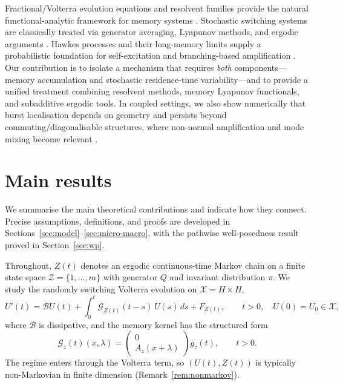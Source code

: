 \documentclass[12pt,a4paper]{article}
\theoremstyle{plain}
\theoremstyle{definition}
\theoremstyle{remark}
\begin{document}
	Fractional/Volterra evolution equations and resolvent families provide the natural functional-analytic framework for memory systems
	\cite{pruss1993evolution,bazhlekova2000fractional}.
	Stochastic switching systems are classically treated via generator averaging, Lyapunov methods, and ergodic arguments
	\cite{mao1999,yin2010}.
	Hawkes processes and their long-memory limits supply a probabilistic foundation for self-excitation and branching-based amplification
	\cite{hawkes1971spectra,bremaud1996,jaisson2015limit,jaisson2016rough,chevallier2019}.
	Our contribution is to isolate a mechanism that requires \emph{both} components---memory accumulation and stochastic residence-time
	variability---and to provide a unified treatment combining resolvent methods, memory Lyapunov functionals, and subadditive ergodic
	tools.
	In coupled settings, we also show numerically that burst localisation depends on geometry and persists beyond commuting/diagonalisable
	structures, where non-normal amplification and mode mixing become relevant \cite{trefethen2005,benaych2018,bordenave2020}.
	
\section{Main results}
\label{sec:main}

We summarise the main theoretical contributions and indicate how they connect.
Precise assumptions, definitions, and proofs are developed in
Sections~\ref{sec:model}--\ref{sec:micro-macro}, with the pathwise well-posedness
result proved in Section~\ref{sec:wp}.

Throughout, $Z(t)$ denotes an ergodic continuous-time Markov chain on a finite
state space $\mathcal Z=\{1,\dots,m\}$ with generator $Q$ and invariant
distribution $\pi$.
We study the randomly switching Volterra evolution on $\mathcal X=H\times H$,
\begin{equation}
	\label{eq:main-switching-main}
	U'(t)
	=
	\mathcal{B}U(t)
	+
	\int_0^t \mathcal{G}_{Z(t)}(t-s)\,U(s)\,ds
	+
	F_{Z(t)}, \qquad t>0,\quad U(0)=U_0\in\mathcal{X},
\end{equation}
where $\mathcal B$ is dissipative, and the memory kernel has the structured form
\begin{equation}
	\label{eq:Gz-structure-main}
	\mathcal{G}_z(t)(x,\lambda)
	=
	\begin{pmatrix}
		0\\ A_z(x+\lambda)
	\end{pmatrix} g_z(t),
	\qquad t>0.
\end{equation}
The regime enters through the Volterra term, so $(U(t),Z(t))$ is typically non-Markovian
in finite dimension (Remark~\ref{rem:nonmarkov}).
\end{document}
